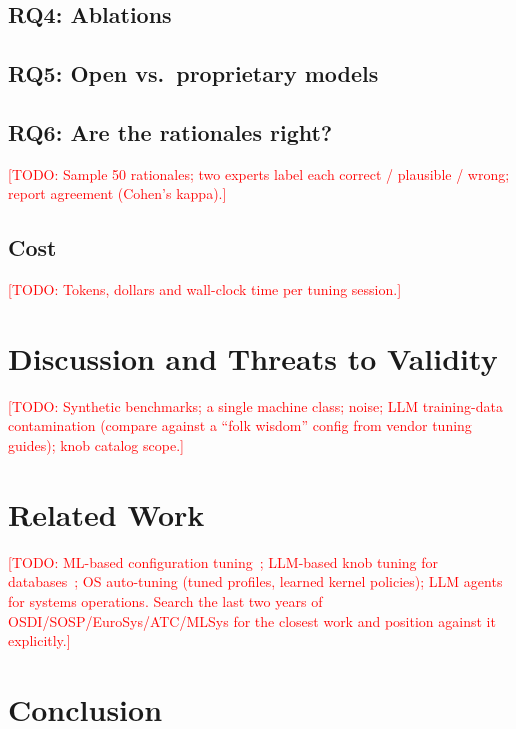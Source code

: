 \documentclass[10pt,twocolumn]{article}
\newcommand{\todo}[1]{\textcolor{red}{[TODO: #1]}}
\begin{document}
\subsection{RQ4: Ablations}
\subsection{RQ5: Open vs.\ proprietary models}
\subsection{RQ6: Are the rationales right?}
\todo{Sample 50 rationales; two experts label each correct / plausible /
wrong; report agreement (Cohen's kappa).}
\subsection{Cost}
\todo{Tokens, dollars and wall-clock time per tuning session.}

\section{Discussion and Threats to Validity}
\todo{Synthetic benchmarks; a single machine class; noise; LLM training-data
contamination (compare against a ``folk wisdom'' config from vendor tuning
guides); knob catalog scope.}

\section{Related Work}
\todo{ML-based configuration tuning~\cite{vanaken2017ottertune,zhu2017bestconfig};
LLM-based knob tuning for databases~\cite{lao2024gptuner}; OS auto-tuning
(tuned profiles, learned kernel policies); LLM agents for systems operations.
Search the last two years of OSDI/SOSP/EuroSys/ATC/MLSys for the closest work
and position against it explicitly.}

\section{Conclusion}



\end{document}
